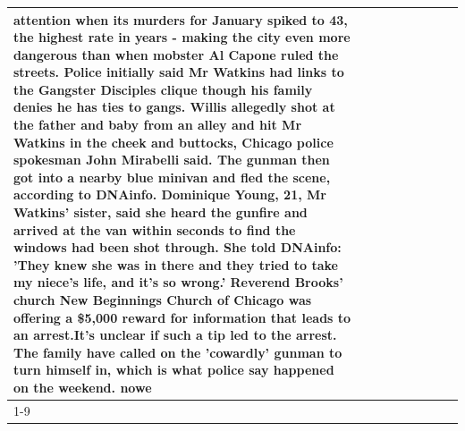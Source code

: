 \begin{table}[H]
\begin{tabular}{lllrlllll}
attention when its murders for January spiked to 43, the highest rate in years - making the city even more dangerous than when mobster Al Capone ruled the streets. Police initially said Mr Watkins had links to the Gangster Disciples clique though his family denies he has ties to gangs. Willis allegedly shot at the father and baby from an alley and hit Mr Watkins in the cheek and buttocks, Chicago police spokesman John Mirabelli said. The gunman then got into a nearby blue minivan and fled the scene, according to DNAinfo. Dominique Young, 21, Mr Watkins' sister, said she heard the gunfire and arrived at the van within seconds to find the windows had been shot through. She told DNAinfo: 'They knew she was in there and they tried to take my niece's life, and it's so wrong.' Reverend Brooks' church New Beginnings Church of Chicago was offering a \$5,000 reward for information that leads to an arrest.It's unclear if such a tip led to the arrest. The family have called on the 'cowardly' gunman to turn himself in, which is what police say happened on the weekend. nowe \\
\cline{1-9}

\end{tabular}
\end{table}
